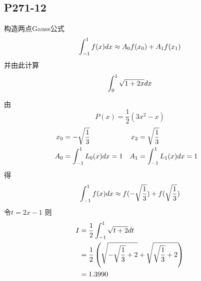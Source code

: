 \subsection{P271-12}
构造两点Gauss公式
\begin{displaymath}
\int_{-1}^{1} {f(x)} d{x} \approx A_0 f(x_0) + A_1 f(x_1)
\end{displaymath}
并由此计算
\begin{displaymath}
\int_{0}^{1} {\sqrt{1 + 2x}} d{x}
\end{displaymath}
\begin{SOLVE}
由
\begin{displaymath}
P(x) = \frac{1}{2}(3 x^2 - x)
\end{displaymath}
\begin{align*}
x_0 & = -\sqrt{\frac{1}{3}} &
x_2 & = \sqrt{\frac{1}{3}} \\
A_0 & = \int_{-1}^{1} {L_0(x)} d{x} = 1 &
A_1 & = \int_{-1}^{1} {L_1(x)} d{x} = 1 &
\end{align*}
得
\begin{displaymath}
\int_{-1}^{1} {f(x)} d{x} \approx f(-\sqrt{\frac{1}{3}}) + f(\sqrt{\frac{1}{3}})
\end{displaymath}
令$t = 2x - 1$
则
\begin{align*}
I & = \frac{1}{2} \int_{-1}^{1} {\sqrt{t + 2}} d{t} \\
  & = \frac{1}{2} \left( \sqrt{-\sqrt{\frac{1}{3}} + 2} + \sqrt{\sqrt{\frac{1}{3}} + 2} \right) \\
  & = 1.3990
\end{align*}
\end{SOLVE}
